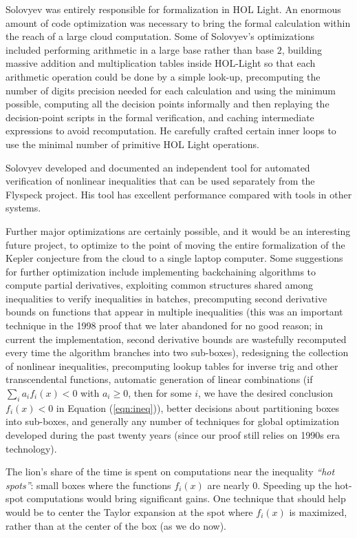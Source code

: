 \documentclass{amsart}
\begin{document}
Solovyev was entirely responsible for 
formalization in HOL Light.
An enormous amount of code optimization was necessary to bring the
formal calculation within the reach of a large cloud computation.
Some of Solovyev's optimizations included performing arithmetic in a
large base rather than base $2$, building massive addition and
multiplication tables inside HOL-Light so that each arithmetic
operation could be done by a simple look-up, precomputing the number
of digits precision needed for each calculation and using the minimum
possible, computing all the decision points informally and then
replaying the decision-point scripts in the formal verification, and
caching intermediate expressions to avoid recomputation.  He carefully
crafted certain inner loops to use the minimal number of primitive HOL
Light operations.

Solovyev developed and documented an independent tool for automated
verification of nonlinear inequalities that can be used separately
from the Flyspeck project.  His tool has excellent performance
compared with tools in other systems.

Further major optimizations are certainly possible, and it would be an
interesting future project, to optimize to the point of moving the
entire formalization of the Kepler conjecture from the cloud to a
single laptop computer.  Some suggestions for further optimization
include implementing backchaining algorithms to compute partial
derivatives, exploiting common structures shared among inequalities to
verify inequalities in batches, precomputing second derivative bounds
on functions that appear in multiple inequalities (this was an
important technique in the 1998 proof that we later abandoned for no
good reason; in current the implementation, second derivative bounds
are wastefully recomputed every time the algorithm branches into two
sub-boxes), redesigning the collection of nonlinear inequalities,
precomputing lookup tables for inverse trig and other transcendental
functions, automatic generation of linear combinations (if $\sum_i a_i
f_i(x) < 0$ with $a_i\ge 0$, then for some $i$, we have the desired
conclusion $f_i(x) < 0$ in Equation (\ref{eqn:ineq})), better
decisions about partitioning boxes into sub-boxes, and generally any
number of techniques for global optimization developed during the past
twenty years (since our proof still relies on 1990s era technology).


The lion's share of the time is spent on computations near the
inequality \emph{``hot spots''}: small boxes where the functions
$f_i(x)$ are nearly $0$.  Speeding up the hot-spot computations would
bring significant gains.  One technique that should help would be to
center the Taylor expansion at the spot where $f_i(x)$ is maximized,
rather than at the center of the box (as we do now).
\end{document}
